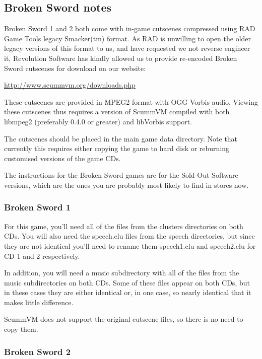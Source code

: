 \subsection{Broken Sword notes}

Broken Sword 1 and 2 both come with in-game cutscenes compressed using
RAD Game Tools legacy Smacker(tm) format. As RAD is unwilling to open
the older legacy versions of this format to us, and have requested we not
reverse engineer it, Revolution Software has kindly allowed us to provide
re-encoded Broken Sword cutscenes for download on our website:

  \url{http://www.scummvm.org/downloads.php}

These cutscenes are provided in MPEG2 format with OGG Vorbis audio.
Viewing these cutscenes thus requires a version of ScummVM compiled
with both libmpeg2 (preferably 0.4.0 or greater) and libVorbis support.

The cutscenes should be placed in the main game data directory. Note that
currently this requires either copying the game to hard disk or reburning
customised versions of the game CDs.

The instructions for the Broken Sword games are for the Sold-Out Software
versions, which are the ones you are probably most likely to find in stores
now.


\subsubsection{Broken Sword 1}

For this game, you'll need all of the files from the clusters directories on
both CDs. You will also need the speech.clu files from the speech directories,
but since they are not identical you'll need to rename them speech1.clu and
speech2.clu for CD 1 and 2 respectively.

In addition, you will need a music subdirectory with all of the files from the
music subdirectories on both CDs. Some of these files appear on both CDs, but
in these cases they are either identical or, in one case, so nearly identical
that it makes little difference.

ScummVM does not support the original cutscene files, so there is no need to
copy them.


\subsubsection{Broken Sword 2}

